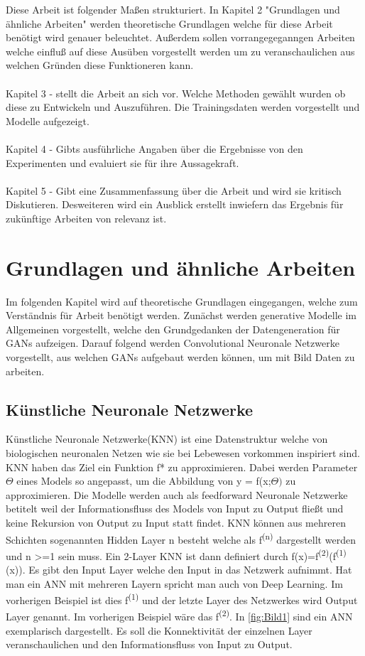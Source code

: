 \documentclass{llncs}
\begin{document}
Diese Arbeit ist folgender Maßen strukturiert. In Kapitel 2 "Grundlagen und ähnliche Arbeiten" werden theoretische Grundlagen welche für diese Arbeit benötigt wird genauer beleuchtet. Außerdem sollen vorrangegeganngen Arbeiten welche einfluß auf diese Ausüben vorgestellt werden um zu veranschaulichen aus welchen Gründen diese Funktioneren kann.
\\\\
Kapitel 3 - stellt die Arbeit an sich vor. Welche Methoden gewählt wurden ob diese zu Entwickeln und Auszuführen. Die Trainingsdaten werden vorgestellt und Modelle aufgezeigt.
\\\\
Kapitel 4 - Gibts  ausführliche Angaben über die Ergebnisse von den Experimenten und evaluiert sie für ihre Aussagekraft.
\\\\
Kapitel 5 - Gibt eine Zusammenfassung über die Arbeit und wird sie kritisch Diskutieren. Desweiteren wird ein Ausblick erstellt inwiefern das Ergebnis für zukünftige Arbeiten von relevanz ist. 

\section{Grundlagen und ähnliche Arbeiten}

Im folgenden Kapitel wird auf theoretische Grundlagen eingegangen, welche zum Verständnis für Arbeit benötigt werden. Zunächst werden  generative Modelle im Allgemeinen vorgestellt, welche den Grundgedanken der Datengeneration für GANs aufzeigen. Darauf folgend werden Convolutional Neuronale Netzwerke vorgestellt, aus welchen GANs aufgebaut werden können, um mit Bild Daten zu arbeiten.

\subsection{Künstliche Neuronale Netzwerke}

Künstliche Neuronale Netzwerke(KNN) ist eine Datenstruktur welche von biologischen neuronalen Netzen wie sie bei Lebewesen vorkommen inspiriert sind. KNN haben das Ziel ein Funktion f* zu approximieren. Dabei werden Parameter $\Theta$ eines Models so angepasst, um die Abbildung von y = f(x;$\Theta)$ zu approximieren. Die Modelle werden auch als feedforward Neuronale Netzwerke betitelt weil der Informationsfluss des Models von Input zu Output fließt und keine Rekursion von Output zu Input statt findet. KNN können aus mehreren Schichten sogenannten Hidden Layer n besteht welche als f\textsuperscript{(n)} dargestellt werden und n >=1 sein muss. Ein 2-Layer KNN ist dann definiert durch f(x)=f\textsuperscript{(2)}(f\textsuperscript{(1)}(x)). Es gibt den Input Layer welche den Input in das Netzwerk aufnimmt. Hat man ein ANN mit mehreren Layern spricht man auch von Deep Learning. Im vorherigen Beispiel ist dies f\textsuperscript{(1)} und der letzte Layer des Netzwerkes wird Output Layer genannt. Im vorherigen Beispiel wäre das f\textsuperscript{(2)}\cite{Grundlagen}. In \ref{fig:Bild1} sind ein ANN exemplarisch dargestellt. Es soll die Konnektivität der einzelnen Layer veranschaulichen und den Informationsfluss von Input zu Output. 
\end{document}
